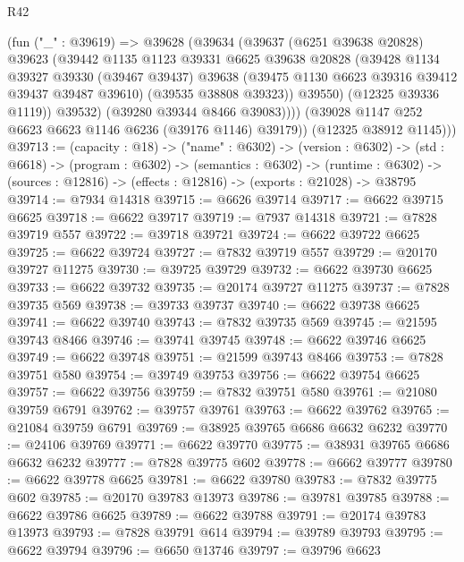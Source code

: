 \begin{lexlean}{R42}
\begin{coremodule}
{              (fun ("_" : @39619) =>
              @39628
                (@39634
                  (@39637
                    (@6251 @39638 @20828)
                    @39623
                    (@39442
                      @1135
                      @1123
                      @39331
                      @6625
                      @39638
                      @20828
                      (@39428
                        @1134
                        @39327
                        @39330
                        (@39467 @39437)
                        @39638
                        (@39475 @1130 @6623 @39316 @39412 @39437 @39487 @39610)
                        (@39535 @38808 @39323))
                      @39550)
                    (@12325 @39336 @1119))
                  @39532)
                (@39280 @39344 @8466 @39083))))
          (@39028 @1147 @252 @6623 @6623 @1146 @6236 (@39176 @1146) @39179))
        (@12325 @38912 @1145)))
@39713 := (capacity : @18) ->
  ("name" : @6302) ->
  (version : @6302) ->
  (std : @6618) ->
  (program : @6302) ->
  (semantics : @6302) ->
  (runtime : @6302) -> (sources : @12816) -> (effects : @12816) -> (exports : @21028) -> @38795
@39714 := @7934 @14318
@39715 := @6626 @39714
@39717 := @6622 @39715 @6625
@39718 := @6622 @39717
@39719 := @7937 @14318
@39721 := @7828 @39719 @557
@39722 := @39718 @39721
@39724 := @6622 @39722 @6625
@39725 := @6622 @39724
@39727 := @7832 @39719 @557
@39729 := @20170 @39727 @11275
@39730 := @39725 @39729
@39732 := @6622 @39730 @6625
@39733 := @6622 @39732
@39735 := @20174 @39727 @11275
@39737 := @7828 @39735 @569
@39738 := @39733 @39737
@39740 := @6622 @39738 @6625
@39741 := @6622 @39740
@39743 := @7832 @39735 @569
@39745 := @21595 @39743 @8466
@39746 := @39741 @39745
@39748 := @6622 @39746 @6625
@39749 := @6622 @39748
@39751 := @21599 @39743 @8466
@39753 := @7828 @39751 @580
@39754 := @39749 @39753
@39756 := @6622 @39754 @6625
@39757 := @6622 @39756
@39759 := @7832 @39751 @580
@39761 := @21080 @39759 @6791
@39762 := @39757 @39761
@39763 := @6622 @39762
@39765 := @21084 @39759 @6791
@39769 := @38925 @39765 @6686 @6632 @6232
@39770 := @24106 @39769
@39771 := @6622 @39770
@39775 := @38931 @39765 @6686 @6632 @6232
@39777 := @7828 @39775 @602
@39778 := @6662 @39777
@39780 := @6622 @39778 @6625
@39781 := @6622 @39780
@39783 := @7832 @39775 @602
@39785 := @20170 @39783 @13973
@39786 := @39781 @39785
@39788 := @6622 @39786 @6625
@39789 := @6622 @39788
@39791 := @20174 @39783 @13973
@39793 := @7828 @39791 @614
@39794 := @39789 @39793
@39795 := @6622 @39794
@39796 := @6650 @13746
@39797 := @39796 @6623
}
\end{coremodule}
\end{lexlean}
